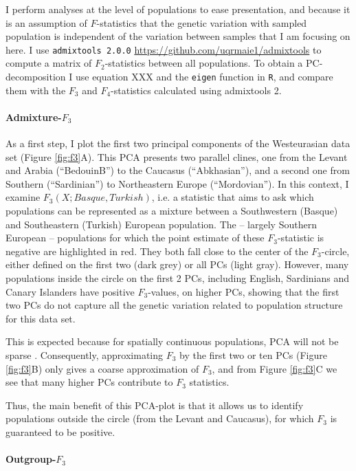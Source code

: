 \documentclass[10pt,a4paper]{article}
\begin{document}
I perform analyses at the level of populations to ease presentation, and because it is an assumption of $F$-statistics that the genetic variation with sampled population is independent of the variation between samples that I am focusing on here. I use \texttt{admixtools 2.0.0} \url{https://github.com/uqrmaie1/admixtools} to compute a matrix of $F_2$-statistics between all populations. To obtain a PC-decomposition I use equation XXX and the \texttt{eigen} function in \texttt{R}, and compare them with the $F_3$ and $F_4$-statistics calculated using admixtools 2.

\paragraph{Admixture-$F_3$}
As a first step, I plot the first two principal components of the Westeurasian data set (Figure \ref{fig:f3}A). This PCA presents two parallel clines, one from the Levant and Arabia (``BedouinB'') to the Caucasus (``Abkhasian''), and a second one from Southern (``Sardinian'') to Northeastern Europe (``Mordovian''). In this context, I examine $F_3(X; Basque, Turkish)$, i.e. a statistic that aims to ask which populations can be represented as a mixture between a Southwestern (Basque) and Southeastern (Turkish) European population. The -- largely Southern European -- populations for which the point estimate of these $F_3$-statistic is negative are highlighted in red. They both fall close to the center of the $F_3$-circle, either defined on the first two (dark grey) or all PCs (light gray). However, many populations inside the circle on the first 2 PCs, including English, Sardinians and Canary Islanders have positive $F_3$-values, on higher PCs, showing that the first two PCs do not capture all the genetic variation related to population structure for this data set. 

This is expected because for spatially continuous populations, PCA will not be sparse \cite{novembre2008a}.  Consequently, approximating $F_3$ by the first two or ten PCs (Figure \ref{fig:f3}B) only gives a coarse approximation of $F_3$, and from Figure \ref{fig:f3}C we see that many higher PCs contribute to $F_3$ statistics.

Thus, the main benefit of this PCA-plot is that it allows us to identify populations outside the circle (from the Levant and Caucasus), for which $F_3$ is guaranteed to be positive.

\paragraph{Outgroup-$F_3$}
\end{document}
